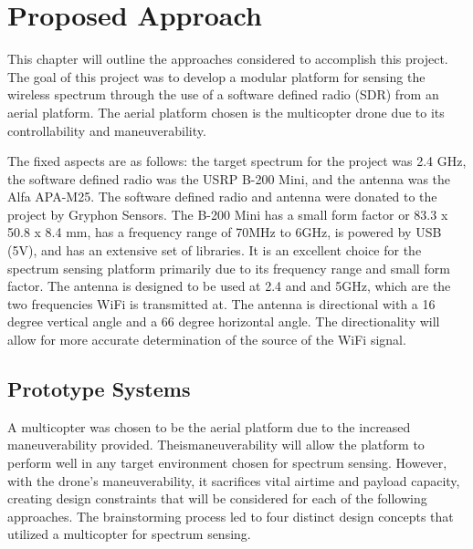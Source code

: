 \chapter{Proposed Approach}
This chapter will outline the approaches considered to accomplish this project. The goal of this project was to develop a modular platform for sensing the wireless spectrum through the use of a software defined radio (SDR) from an aerial platform. The aerial platform chosen is the multicopter drone due to its controllability and maneuverability. \par

The fixed aspects are as follows: the target spectrum for the project was 2.4 GHz, the software defined radio was the USRP B-200 Mini, and the antenna was the Alfa APA-M25. The software defined radio and antenna were donated to the project by Gryphon Sensors. The B-200 Mini has a small form factor or 83.3 x 50.8 x 8.4 mm, has a frequency range of 70MHz to 6GHz, is powered by USB (5V), and has an extensive set of libraries. It is an excellent choice for the spectrum sensing platform primarily due to its frequency range and small form factor. The antenna is designed to be used at 2.4 and and 5GHz, which are the two frequencies WiFi is transmitted at. The antenna is directional with a 16 degree vertical angle and a 66 degree horizontal angle. The directionality will allow for more accurate determination of the source of the WiFi signal.

\section{Prototype Systems}
A multicopter was chosen to be the aerial platform due to the increased maneuverability provided. Theismaneuverability will allow the platform to perform well in any target environment chosen for spectrum sensing. However, with the drone’s maneuverability, it sacrifices vital airtime and payload capacity, creating design constraints that will be considered for each of the following approaches. The brainstorming process led to four distinct design concepts that utilized a multicopter for spectrum sensing. \par

